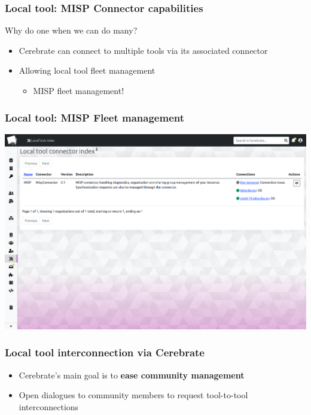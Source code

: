\begin{frame}
\frametitle{Local tool: MISP Connector capabilities}
    Why do one when we can do many?
    \begin{itemize}
        \item Cerebrate can connect to multiple tools via its associated connector
        \item Allowing local tool fleet management
        \begin{itemize}
            \item MISP fleet management!
        \end{itemize}
    \end{itemize}
\end{frame}

\begin{frame}
    \frametitle{Local tool: MISP Fleet management}
    \begin{center}
        \includegraphics[width=0.97\linewidth]{pictures/localtools-index.png}
    \end{center}
\end{frame}

\begin{frame}
\frametitle{Local tool interconnection via Cerebrate}
    \begin{itemize}
        \item Cerebrate's main goal is to \textbf{ease community management}
        \item Open dialogues to community members to request tool-to-tool interconnections
    \end{itemize}
\end{frame}

